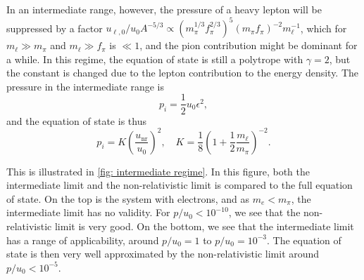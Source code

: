 \documentclass{book}
\begin{document}
In an intermediate range, however, the pressure of a heavy lepton will be suppressed by a factor 
$
u_{\ell,0}/ u_0 A^{-5/3}\propto 
(m_\pi^{1/3} f_\pi^{{2}/{3}})^5 (m_\pi f_\pi)^{-2} m_\ell^{-1}
$, 
which for $m_\ell \gg m_\pi$ and $m_\ell \gg f_\pi$ is $\ll 1$, and the pion contribution might be dominant for a while.
In this regime, the equation of state is still a polytrope with $\gamma = 2$, but the constant is changed due to the lepton contribution to the energy density.
The pressure in the intermediate range is
%
\begin{equation}
    p_i = \frac{1}{2} u_0 \epsilon^2,
\end{equation}
%
and the equation of state is thus
%
\begin{equation}
    p_i = K \left(\frac{u_\text{nr}}{u_0}\right)^2, \quad 
    K = \frac{1}{8} \left( 1 + \frac{1}{2} \frac{m_{\ell}}{m_\pi} \right)^{-2}.
\end{equation}


This is illustrated in \autoref{fig: intermediate regime}.
In this figure, both the intermediate limit and the non-relativistic limit is compared to the full equation of state.
On the top is the system with electrons, and as $m_e < m_\pi$, the intermediate limit has no validity.
For $p/u_0 < 10^{-10}$, we see that the non-relativistic limit is very good.
On the bottom, we see that the intermediate limit has a range of applicability, around $p/u_0 = 1$ to $p/u_0 = 10^{-3}$.
The equation of state is then very well approximated by the non-relativistic limit around $p/u_0 < 10^{-5}$.
\end{document}
